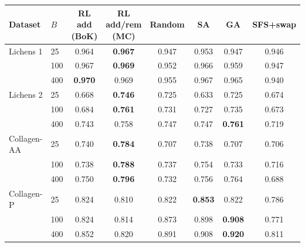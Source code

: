 {\small
\setlength{\tabcolsep}{3pt}
\begin{tabular}{llcccccc}
\toprule
Dataset & $B$ & RL add (BoK) & RL add/rem (MC) & Random & SA & GA & SFS+swap \\
\midrule
Lichens 1 & 25 & 0.964 & \textbf{0.967} & 0.947 & 0.953 & 0.947 & 0.946 \\
 & 100 & 0.967 & \textbf{0.969} & 0.952 & 0.966 & 0.959 & 0.947 \\
 & 400 & \textbf{0.970} & 0.969 & 0.955 & 0.967 & 0.965 & 0.940 \\
\midrule
Lichens 2 & 25 & 0.668 & \textbf{0.746} & 0.725 & 0.633 & 0.725 & 0.674 \\
 & 100 & 0.684 & \textbf{0.761} & 0.731 & 0.727 & 0.735 & 0.673 \\
 & 400 & 0.743 & 0.758 & 0.747 & 0.747 & \textbf{0.761} & 0.719 \\
\midrule
Collagen-AA & 25 & 0.740 & \textbf{0.784} & 0.707 & 0.738 & 0.707 & 0.706 \\
 & 100 & 0.738 & \textbf{0.788} & 0.737 & 0.754 & 0.733 & 0.716 \\
 & 400 & 0.750 & \textbf{0.796} & 0.732 & 0.756 & 0.764 & 0.688 \\
\midrule
Collagen-P & 25 & 0.824 & 0.810 & 0.822 & \textbf{0.853} & 0.822 & 0.786 \\
 & 100 & 0.824 & 0.814 & 0.873 & 0.898 & \textbf{0.908} & 0.771 \\
 & 400 & 0.852 & 0.820 & 0.891 & 0.908 & \textbf{0.920} & 0.811 \\
\bottomrule
\end{tabular}
}
